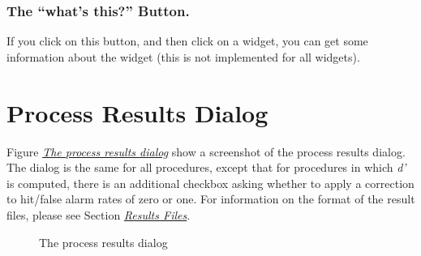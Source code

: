\documentclass[a4paper,12pt,english]{sphinxmanual}
\begin{document}
\subsubsection{The “what’s this?” Button.}
\label{graphical_user_interface:the-whats-this-button}
If you click on this button, and then click on a widget, you can get
some information about the widget (this is not implemented for all
widgets).


\section{Process Results Dialog}
\label{graphical_user_interface:process-results-dialog}\label{graphical_user_interface:sec-process-results-dialog}
Figure {\hyperref[graphical_user_interface:fig-proc-res-dia]{\emph{The process results dialog}}} show a screenshot of the
process results dialog. The dialog is the same for all procedures,
except that for procedures in which \emph{d’} is computed, there is an
additional checkbox asking whether to apply a correction to hit/false
alarm rates of zero or one. For information on the format of the result
files, please see Section {\hyperref[engine:sec-results-files]{\emph{Results Files}}}.
\begin{figure}[htbp]
\centering
\capstart

\caption{The process results dialog}\label{graphical_user_interface:fig-proc-res-dia}\end{figure}
\end{document}

